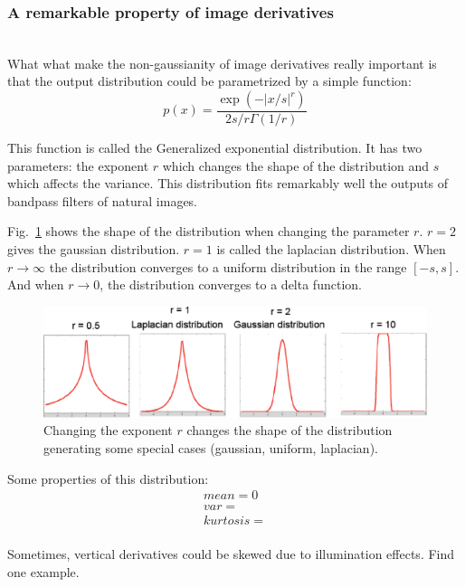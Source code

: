 \subsubsection{A remarkable property of image derivatives}
~\\

What what make the non-gaussianity of image derivatives really important is that the output distribution could be parametrized by a simple function:
\begin{equation}
  p(x) = \frac{\exp \left(- \left| x/s  \right|^r \right)}{2s/r \Gamma(1/r)}
  \label{eq:derdist}
\end{equation}

This function is called the Generalized exponential distribution. It has two parameters: the exponent $r$ which changes the shape of the distribution and $s$ which affects the variance. This distribution fits remarkably well the outputs of bandpass filters of natural images.

Fig.~\ref{fig:generalizedgaussian} shows the shape of the distribution when changing the parameter $r$. $r=2$ gives the gaussian distribution. $r=1$ is called the laplacian distribution. When $r \to \infty$ the distribution converges to a uniform distribution in the range $\left[-s, s\right]$. And when $r \to 0$, the distribution converges to a delta function.
\begin{figure}[htpb]
  \centerline{
    \includegraphics[width=1\linewidth]{figures/statistical_image_models/generalizedgaussian.eps}
  }
  \caption{Changing the exponent $r$ changes the shape of the distribution generating some special cases (gaussian, uniform, laplacian).}
  \label{fig:generalizedgaussian}
\end{figure}


Some properties of this distribution:
\begin{eqnarray}
  mean = 0\\
  var = \\
  kurtosis = \\
\end{eqnarray}

Sometimes, vertical derivatives could be skewed due to illumination effects. Find one example.

